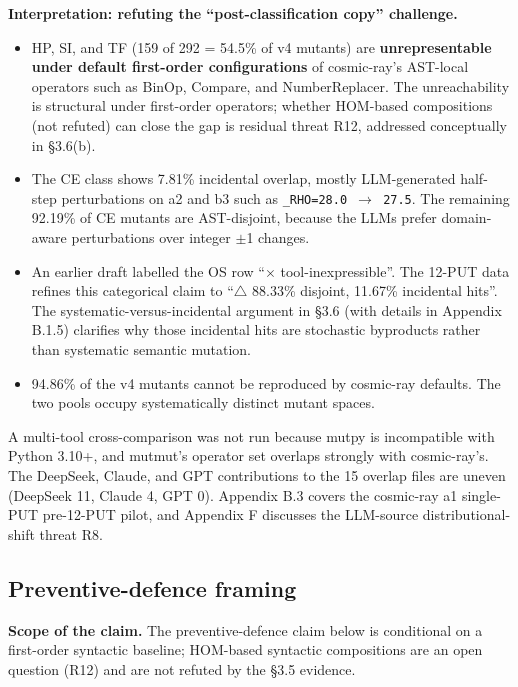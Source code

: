 \documentclass[manuscript,screen,review]{acmart}
\begin{document}
\textbf{Interpretation: refuting the ``post-classification copy''
challenge.}

\begin{itemize}

\item
  HP, SI, and TF (159 of 292 = 54.5\% of v4 mutants) are
  \textbf{unrepresentable under default first-order configurations} of
  cosmic-ray's AST-local operators such as BinOp, Compare, and
  NumberReplacer. The unreachability is structural under first-order
  operators; whether HOM-based compositions \citep{jia2008subtle} (not
  refuted) can close the gap is residual threat R12, addressed
  conceptually in §3.6(b).
\item
  The CE class shows 7.81\% incidental overlap, mostly LLM-generated
  half-step perturbations on a2 and b3 such as
  \texttt{\_RHO=28.0\ $\to$\ 27.5}. The remaining 92.19\% of CE mutants are
  AST-disjoint, because the LLMs prefer domain-aware perturbations over
  integer $\pm$1 changes.
\item
  An earlier draft labelled the OS row ``$\times$ tool-inexpressible''. The
  12-PUT data refines this categorical claim to ``$\bigtriangleup$ 88.33\% disjoint,
  11.67\% incidental hits''. The systematic-versus-incidental argument
  in §3.6 (with details in Appendix B.1.5) clarifies why those
  incidental hits are stochastic byproducts rather than systematic
  semantic mutation.
\item
  94.86\% of the v4 mutants cannot be reproduced by cosmic-ray defaults.
  The two pools occupy systematically distinct mutant spaces.
\end{itemize}

A multi-tool cross-comparison was not run because mutpy is incompatible
with Python 3.10+, and mutmut's operator set overlaps strongly with
cosmic-ray's. The DeepSeek, Claude, and GPT contributions to the 15
overlap files are uneven (DeepSeek 11, Claude 4, GPT 0). Appendix B.3
covers the cosmic-ray a1 single-PUT pre-12-PUT pilot, and Appendix F
discusses the LLM-source distributional-shift threat R8.

\subsection{Preventive-defence framing}\label{preventive-defence-framing}

\textbf{Scope of the claim.} The preventive-defence claim below is
conditional on a first-order syntactic baseline; HOM-based syntactic
compositions are an open question (R12) and are not refuted by the §3.5
evidence.
\end{document}
